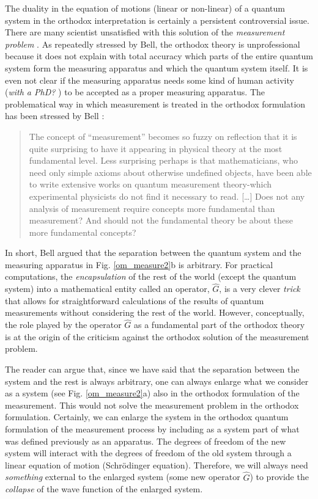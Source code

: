 \documentclass[nofootinbib, secnumarabic, amsmath, nobibnotes,11pt,aps,pra, floatfix]{revtex4-1}
\newcommand{\fref}[1]{Fig. \ref{#1}}
\begin{document}
The duality in the equation of motions (linear or non-linear) of a quantum system in the orthodox interpretation is certainly a persistent controversial issue. There are many scientist unsatisfied with this solution of the \textit{measurement problem} \cite{om.bell1990}. As repeatedly stressed by Bell, the orthodox theory is unprofessional because it does not explain with total accuracy which parts of the entire quantum system form the measuring apparatus and which the quantum system itself. It is even not clear if the measuring apparatus needs some kind of human activity (\textit{with a PhD?} \cite{om.bell1990}) to be accepted as a proper measuring apparatus. The problematical way in which measurement is treated in the orthodox formulation has been stressed by Bell \cite{om.Bell1987}:
\begin{quote}
The concept of ``measurement'' becomes so fuzzy on reflection that it is quite surprising to have it appearing in physical theory at the most fundamental level. Less surprising perhaps is that mathematicians, who need only simple axioms about otherwise undefined objects, have been able to write extensive works on quantum measurement theory-which experimental physicists do not find it necessary to read. [\ldots] Does not any analysis of measurement require concepts more fundamental than measurement? And should not the fundamental theory be about these more fundamental concepts?
\end{quote}
In short, Bell argued that the separation between the quantum
system and the measuring apparatus in \fref{om_measure2}b is
arbitrary. For practical computations, the \textit{encapsulation} of the rest of the world (except
the quantum system) into a mathematical entity called an operator,
$\hat{G}$\!, is a very clever \textit{trick} that allows for
straightforward calculations of the results of quantum measurements
\cite{om.Durrnaive,om.goldstein} without considering the rest of
the  world. However, conceptually, the role played by the operator $\hat{G}$ as a fundamental 
part of the orthodox theory is at the origin of the criticism against the orthodox solution of the measurement problem. 

The reader can argue that, since we have said that the separation between the system and the rest is always arbitrary, one can always enlarge what we consider as a system (see \fref{om_measure2}a) also in the orthodox formulation of the measurement. This would not solve the measurement problem in the orthodox formulation.
Certainly, we can enlarge the system in the orthodox quantum formulation of the measurement process by including as a system part of what was defined previously as an apparatus. The degrees of freedom of the new system will interact with the degrees of freedom of the old system through a linear equation of motion (Schr\"odinger equation). Therefore, we will always need \emph{something} external to the enlarged system (some new operator $\hat{G}$\!) to provide the \textit{collapse} of the wave function of the enlarged system.  
\end{document}

